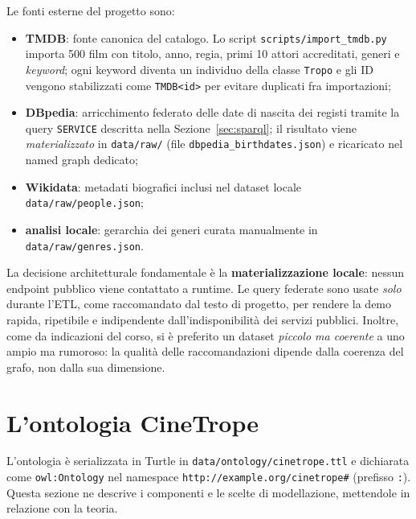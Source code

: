 \documentclass[a4paper,11pt]{article}
\newcommand{\code}[1]{\texttt{#1}}
\begin{document}
Le fonti esterne del progetto sono:

\begin{itemize}[nosep]
  \item \textbf{TMDB}: fonte canonica del catalogo. Lo script
        \code{scripts/import\_tmdb.py} importa 500 film con titolo, anno,
        regia, primi 10 attori accreditati, generi e \emph{keyword}; ogni
        keyword diventa un individuo della classe \code{Tropo} e gli ID
        vengono stabilizzati come \code{TMDB<id>} per evitare duplicati fra
        importazioni;
  \item \textbf{DBpedia}: arricchimento federato delle date di nascita dei
        registi tramite la query \code{SERVICE} descritta nella
        Sezione~\ref{sec:sparql}; il risultato viene
        \emph{materializzato} in \code{data/raw/} (file
        \code{dbpedia\_birthdates.json}) e ricaricato nel named graph
        dedicato;
  \item \textbf{Wikidata}: metadati biografici inclusi nel dataset locale
        \code{data/raw/people.json};
  \item \textbf{analisi locale}: gerarchia dei generi curata manualmente in
        \code{data/raw/genres.json}.
\end{itemize}

La decisione architetturale fondamentale \`e la \textbf{materializzazione
locale}: nessun endpoint pubblico viene contattato a runtime. Le query
federate sono usate \emph{solo} durante l'ETL, come raccomandato dal testo
di progetto, per rendere la demo rapida, ripetibile e indipendente
dall'indisponibilit\`a dei servizi pubblici. Inoltre, come da indicazioni
del corso, si \`e preferito un dataset \emph{piccolo ma coerente} a uno
ampio ma rumoroso: la qualit\`a delle raccomandazioni dipende dalla
coerenza del grafo, non dalla sua dimensione.

\section{L'ontologia CineTrope}\label{sec:ontologia}

L'ontologia \`e serializzata in Turtle in
\code{data/ontology/cinetrope.ttl} e dichiarata come
\code{owl:Ontology} nel namespace \code{http://example.org/cinetrope\#}
(prefisso \code{:}). Questa sezione ne descrive i componenti e le scelte di
modellazione, mettendole in relazione con la teoria.
\end{document}
